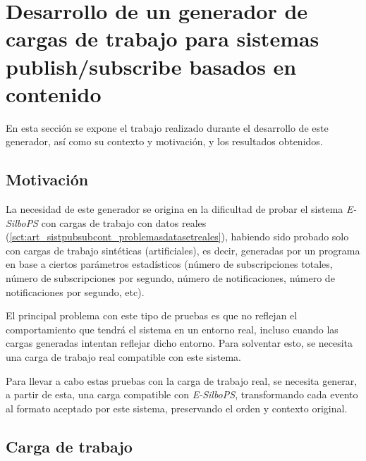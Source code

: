 \chapter{Desarrollo de un generador de cargas de trabajo para sistemas publish/subscribe 
basados en contenido} \label{chp:desarrollo}

En esta sección se expone el trabajo realizado durante el desarrollo de este
generador, así como su contexto y motivación, y los resultados obtenidos.


\section{Motivación} \label{sct:desarrollo_motivacion}

La necesidad de este generador se origina en la dificultad de probar el sistema \textit{E-SilboPS}
con cargas de trabajo con datos reales (\ref{sct:art_sistpubsubcont_problemasdatasetreales}), 
habiendo sido probado solo con cargas de trabajo sintéticas (artificiales),
es decir, generadas por un programa en base a ciertos parámetros estadísticos (número de 
subscripciones totales, número de subscripciones por segundo, número de notificaciones, 
número de notificaciones por segundo, etc).

El principal problema con este tipo de pruebas es que no reflejan el comportamiento que tendrá
el sistema en un entorno real, incluso cuando las cargas generadas intentan reflejar dicho entorno.
Para solventar esto, se necesita una carga de trabajo real compatible con este sistema.

Para llevar a cabo estas pruebas con la carga de trabajo real, se necesita generar, a partir
de esta, una carga compatible con \textit{E-SilboPS}, transformando cada evento al formato aceptado
por este sistema, preservando el orden y contexto original.


\section{Carga de trabajo} \label{sct:desarrollo_carga}

